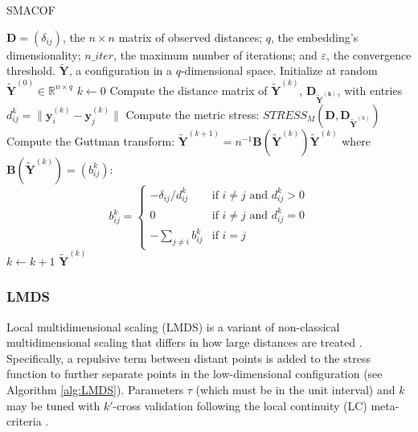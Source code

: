 \begin{algorithm}
    \caption{SMACOF}
    \label{alg:SMACOF}
    
    \begin{algorithmic}[1]
    \REQUIRE $\mathbf{D} = (\delta_{ij})$, the $n\times n$ matrix of observed distances; $q$, the embedding's dimensionality; $n\_iter$, the maximum number of iterations; and $\varepsilon$, the convergence threshold.
    \ENSURE $\boldsymbol{\mathbf{\tilde{Y}}}$, a configuration in a $q$-dimensional space.
    \STATE Initialize at random $\boldsymbol{\mathbf{\tilde{Y}}}^{(0)} \in \mathbb{R}^{n \times q}$
    \STATE $k \leftarrow 0$
    \REPEAT
        \STATE Compute the distance matrix of $\boldsymbol{\mathbf{\tilde{Y}}}^{(k)}$, $\mathbf{D}_{\boldsymbol{\mathbf{\tilde{Y}}^{(k)}}}$, with entries $d_{ij}^k = \|\mathbf{y}_i^{(k)}-\mathbf{y}_j^{(k)}\|$
        \STATE Compute the metric stress: $STRESS_M( \mathbf{D}, \mathbf{D}_{\mathbf{\tilde{Y}}^{(k)}} )$
        \STATE Compute the Guttman transform: $\boldsymbol{\mathbf{\tilde{Y}}}^{(k+1)} = n^{-1}\mathbf{B}(\boldsymbol{\mathbf{\tilde{Y}}}^{(k)})\boldsymbol{\mathbf{\tilde{Y}}}^{(k)}$ where $\mathbf{B}(\boldsymbol{\mathbf{\tilde{Y}}}^{(k)}) = (b_{ij}^k)$:
        $$
        b_{ij}^k =
        \begin{cases}
        -\delta_{ij}/d_{ij}^k & \text{if } i \neq j \text{ and } d_{ij}^k > 0 \\
        0 & \text{if } i \neq j \text{ and } d_{ij}^k = 0 \\
        -\sum_{j \neq i} b_{ij}^k & \text{if } i = j
        \end{cases}
        $$
        \STATE $k \leftarrow k + 1$
    \RETURN $\boldsymbol{\mathbf{\tilde{Y}}}^{(k)}$
    \end{algorithmic}
\end{algorithm}

\subsubsection{LMDS}

Local multidimensional scaling (LMDS) is a variant of non-classical multidimensional scaling that differs in how large distances are treated \citep{Chen2009}. Specifically, a repulsive term between distant points is added to the stress function to further separate points in the low-dimensional configuration (see Algorithm \ref{alg:LMDS}). Parameters $\tau$ (which must be in the unit interval) and $k$ may be tuned with $k'$-cross validation following the local continuity (LC) meta-criteria \citep{Chen2009}.

